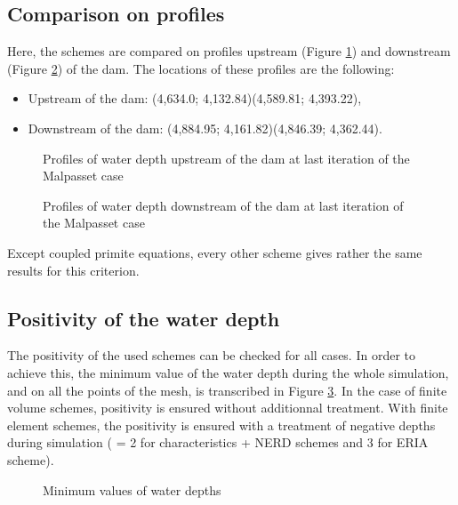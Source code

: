 \subsection{Comparison on profiles}
Here, the schemes are compared on profiles upstream
(Figure \ref{fig:malpasset:upstreamProfile}) and downstream (Figure
\ref{fig:malpasset:downstreamProfile}) of the dam.
The locations of these profiles are the following:
\begin{itemize}
\itemsep0em
\item Upstream of the dam: (4,634.0; 4,132.84)(4,589.81; 4,393.22),
\item Downstream of the dam: (4,884.95; 4,161.82)(4,846.39; 4,362.44).
\end{itemize}

\begin{figure}[H]
  \centering
  \caption{Profiles of water depth upstream of the dam at last iteration of the Malpasset case}\label{fig:malpasset:upstreamProfile}
\end{figure}

\begin{figure}[H]
  \centering
  \caption{Profiles of water depth downstream of the dam at last iteration of the Malpasset case}\label{fig:malpasset:downstreamProfile}
\end{figure}

Except coupled primite equations, every other scheme gives rather the same
results for this criterion.

\subsection{Positivity of the water depth}

The positivity of the used schemes can be checked for all cases.
In order to achieve this, the minimum value of the water depth during the whole
simulation, and on all the points of the mesh, is transcribed in Figure
\ref{fig:malpasset:minmax}.
In the case of finite volume schemes, positivity is ensured without additionnal
treatment.
With finite element schemes, the positivity is ensured with a treatment of
negative depths during simulation ( = 2
for characteristics + NERD schemes and 3 for ERIA scheme).

\begin{figure}[H]
\centering
{}
\caption{Minimum values of water depths}
\label{fig:malpasset:minmax}
\end{figure}

